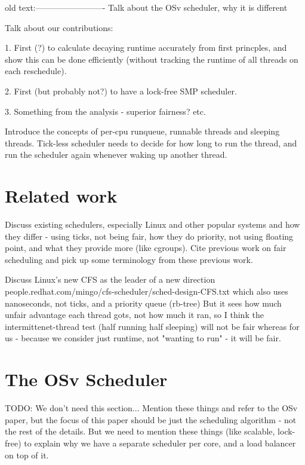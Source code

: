 \documentclass{sig-alternate}
\begin{document}
old text:-------------------------
Talk about the OSv scheduler, why it is different

Talk about our contributions:

1.  First (?) to calculate decaying runtime accurately from first princples,
and show this can be done efficiently (without tracking the runtime of all
threads on each reschedule).

2. First (but probably not?) to have a lock-free SMP scheduler.

3. Something from the analysis - superior fairness? etc.

Introduce the concepts of per-cpu runqueue, runnable threads and sleeping
threads.
Tick-less scheduler needs to decide for how long to run the thread,
and run the scheduler again whenever waking up another thread.


\section{Related work}
Discuss existing schedulers, especially Linux and other popular systems
and how they differ - using ticks, not being fair, how they do priority,
not using floating point, and what they provide more (like cgroups).
Cite previous work on fair scheduling and pick up some terminology from
these previous work.

Discuss Linux's new CFS as the leader of a new direction
people.redhat.com/mingo/cfs-scheduler/sched-design-CFS.txt
which also uses nanoseconds, not ticks, and a priority queue (rb-tree)
But it sees how much unfair advantage each thread gots, not how much it ran,
so I think the intermittenet-thread test (half running half sleeping) will
not be fair whereas for us - because we consider just runtime, not "wanting
to run" - it will be fair.

\section{The OSv Scheduler}
TODO: We don't need this section... Mention these things and refer to the
OSv paper, but the focus of this paper should be just the scheduling
algorithm - not the rest of the details. But we need to mention these things
(like scalable, lock-free) to explain why we have a separate scheduler
per core, and a load balancer on top of it.
\end{document}
